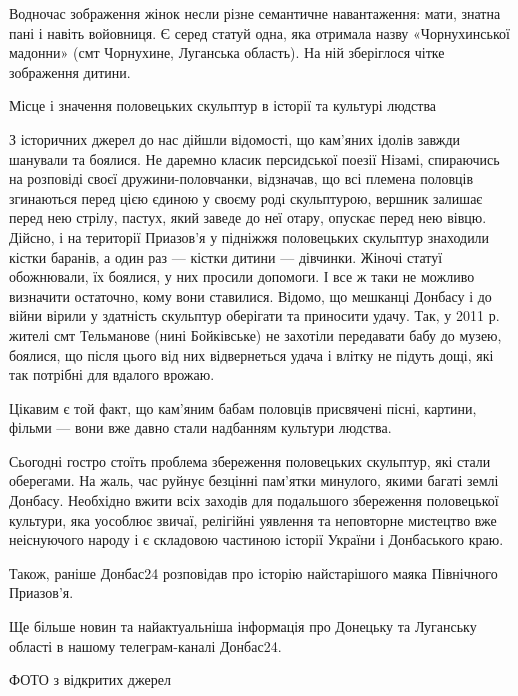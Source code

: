 Водночас зображення жінок несли різне семантичне навантаження: мати, знатна
пані і навіть войовниця. Є серед статуй одна, яка отримала назву «Чорнухинської
мадонни» (смт Чорнухине, Луганська область). На ній зберіглося чітке зображення
дитини.

Місце і значення половецьких скульптур в історії та культурі людства

З історичних джерел до нас дійшли відомості, що кам'яних ідолів завжди шанували
та боялися. Не даремно класик персидської поезії Нізамі, спираючись на
розповіді своєї дружини-половчанки, відзначав, що всі племена половців
згинаються перед цією єдиною у своєму роді скульптурою, вершник залишає перед
нею стрілу, пастух, який заведе до неї отару, опускає перед нею вівцю. Дійсно,
і на території Приазов'я у підніжжя половецьких скульптур знаходили кістки
баранів, а один раз — кістки дитини — дівчинки. Жіночі статуї обожнювали, їх
боялися, у них просили допомоги. І все ж таки не можливо визначити остаточно,
кому вони ставилися. Відомо, що мешканці Донбасу і до війни вірили у здатність
скульптур оберігати та приносити удачу. Так, у 2011 р. жителі смт Тельманове
(нині Бойківське) не захотіли передавати бабу до музею, боялися, що після цього
від них відвернеться удача і влітку не підуть дощі, які так потрібні для
вдалого врожаю.

Цікавим є той факт, що кам'яним бабам половців присвячені пісні, картини,
фільми — вони вже давно стали надбанням культури людства.

Сьогодні гостро стоїть проблема збереження половецьких скульптур, які стали
оберегами. На жаль, час руйнує безцінні пам'ятки минулого, якими багаті землі
Донбасу. Необхідно вжити всіх заходів для подальшого збереження половецької
культури, яка уособлює звичаї, релігійні уявлення та неповторне мистецтво вже
неіснуючого народу і є складовою частиною історії України і Донбаського краю.

Також, раніше Донбас24 розповідав про історію найстарішого маяка Північного Приазов'я.

Ще більше новин та найактуальніша інформація про Донецьку та Луганську області в нашому телеграм-каналі Донбас24.

ФОТО з відкритих джерел
